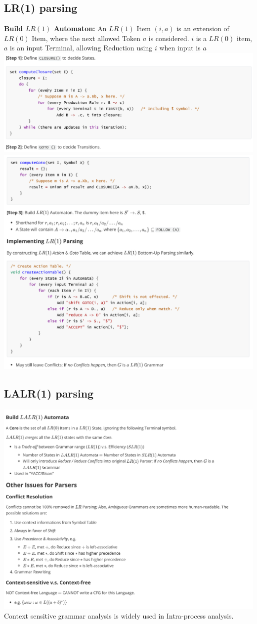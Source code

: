 \documentclass[a4paper]{article}
\theoremstyle{definition}
\begin{document}
\subsection {LR(1) parsing}
\textbf{Build $L R(1)$ Automaton:}
An $L R(1)$ Item $(i, a)$ is an extension of $L R(0)$ Item, where the next allowed Token $a$ is considered.
$i$ is a $L R(0)$ item, $a$ is an input Terminal, allowing Reduction using $i$ when input is $a$
\includegraphics[width=15cm]{img/Snipaste_2021-04-19_17-56-00.png}\\
\includegraphics[width=15cm]{img/Snipaste_2021-04-19_17-56-46.png}
\subsection {LALR(1) parsing}
\includegraphics[width=15cm]{img/Snipaste_2021-04-19_17-57-34.png}
Context sensitive grammar analysis is widely used in Intra-process analysis. 
\end{document}
